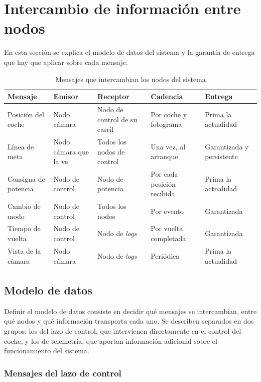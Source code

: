 \section{Intercambio de información entre nodos}
\label{sec:intercambio-informacion-nodos}

En esta sección se explica el modelo de datos del sistema y la garantía de entrega que hay que aplicar sobre cada mensaje.

\begin{table}[tbp]
	\centering
	\estilotabla
	\begin{tabular}{p{2.7cm}|p{2.5cm}|p{2.7cm}|p{2.3cm}|p{2.4cm}}
		\rowcolor{udcpink!25}
		\textbf{Mensaje} & \textbf{Emisor} & \textbf{Receptor} & \textbf{Cadencia} & \textbf{Entrega} \\
		\hline
		Posición del coche & Nodo cámara & Nodo de control de su carril & Por coche y fotograma & Prima la actualidad \\
		Línea de meta & Nodo cámara que la ve & Todos los nodos de control & Una vez, al arranque & Garantizada y persistente \\
		Consigna de potencia & Nodo de control & Nodo de potencia & Por cada posición recibida & Prima la actualidad \\
		Cambio de modo & Nodo de control & Todos los nodos & Por evento & Garantizada \\
		Tiempo de vuelta & Nodo de control & Nodo de \emph{logs} & Por vuelta completada & Garantizada \\
		Vista de la cámara & Nodo cámara & Nodo de \emph{logs} & Periódica & Prima la actualidad \\
	\end{tabular}
	\caption{Mensajes que intercambian los nodos del sistema}
	\label{tab:mensajes}
\end{table}

\subsection{Modelo de datos}
\label{subsec:modelo-datos}

Definir el modelo de datos consiste en decidir qué mensajes se intercambian, entre qué nodos y qué información transporta cada uno. Se describen separados en dos grupos: los del lazo de control, que intervienen directamente en el control del coche, y los de telemetría, que aportan información adicional sobre el funcionamiento del sistema.

\subsubsection{Mensajes del lazo de control}

